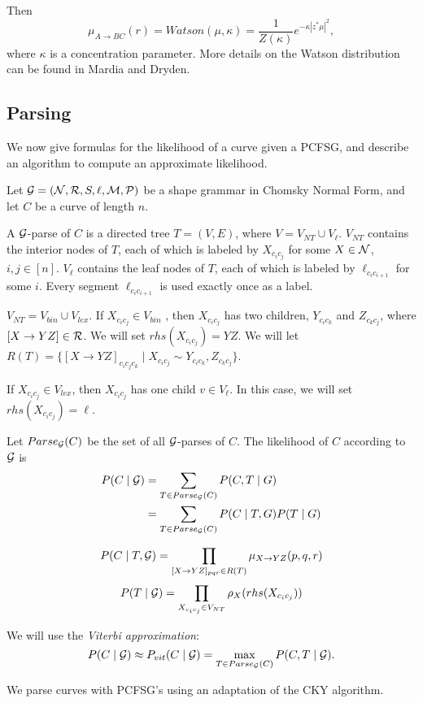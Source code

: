 \documentclass[10pt]{article}
\begin{document}
Then
$$\mu_{A\to BC}(r) = Watson(\mu,\kappa) =
\frac{1}{Z(\kappa)}e^{-\kappa |z^*\mu|^2},$$ where $\kappa$ is a
concentration parameter. More details on the Watson distribution can
be found in Mardia and Dryden\cite{Mardia1999Complex}.

\subsection{Parsing}

We now give formulas for the likelihood of a curve given a PCFSG, and
describe an algorithm to compute an approximate likelihood. 

Let ${\mathcal G} = ({\mathcal N},{\mathcal R},S,\ell,{\mathcal M}, {\mathcal P})$ be a shape grammar in
Chomsky Normal Form, and let $C$ be a curve of length $n$.

A ${\mathcal G}$-parse of $C$ is a directed tree $T=(V,E)$, where $V=V_{NT}
\cup V_\ell$.  $V_{NT}$ contains the interior nodes of $T$, each of
which is labeled by $X_{c_i c_j}$ for some $X\in {\mathcal N}$, $i,j\in
[n]$. $V_\ell$ contains the leaf nodes of $T$, each of which is
labeled by $\ell_{c_i c_{i+1}}$ for some $i$. Every segment $\ell_{c_i
  c_{i+1}}$ is used exactly once as a label.

$V_{NT} = V_{bin} \cup V_{lex}$. If $X_{c_i c_j}\in V_{bin}$ , then
$X_{c_i c_j}$ has two children, $Y_{c_i c_k}$ and $Z_{c_k c_j}$, where
$[X\to YZ] \in {\mathcal R}$. We will set $rhs(X_{c_i c_j})=YZ$.  We will let
$R(T) = \{ [X\to YZ]_{c_i c_j c_k} \mid X_{c_i c_j} \sim Y_{c_i c_k},
Z_{c_k c_j}\}$.

If $X_{c_i c_j}\in V_{lex}$, then $X_{c_i c_j}$ has one child $v\in
V_\ell$. In this case, we will set $rhs(X_{c_i c_j})=\ell$.

Let $Parse_{{\mathcal G}}(C)$ be the set of all ${\mathcal G}$-parses of $C$.  The
likelihood of $C$ according to ${\mathcal G}$ is
\begin{align*}
P(C\mid{\mathcal G}) &= \sum_{T\in Parse_{{\mathcal G}}(C)} P(C,T\mid G)\\
&= \sum_{T\in Parse_{{\mathcal G}}(C)} P(C\mid T, G) P(T\mid G)\\
\end{align*}

$$P(C\mid T,{\mathcal G}) = \prod_{[X\to YZ]_{pqr}\in R(T)} \mu_{X\to YZ}(p,q,r)$$
$$P(T\mid {\mathcal G}) = \prod_{X_{c_i c_j}\in V_{NT}} \rho_{X}(rhs(X_{c_i c_j}))$$

We will use the {\em Viterbi approximation}:
$$P(C\mid{\mathcal G}) \approx P_{vit}(C\mid {\mathcal G}) = \max_{T\in Parse_{{\mathcal G}}(C)}
P(C,T\mid {\mathcal G}).$$

We parse curves with PCFSG's using an adaptation of the CKY algorithm.
\end{document}
